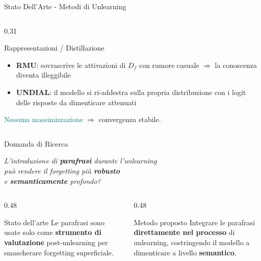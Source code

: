 \documentclass[aspectratio=169,11pt]{beamer}
\begin{document}
\begin{frame}{Stato Dell'Arte - Metodi di Unlearning}
\begin{columns}[T]
\begin{column}{0.31\textwidth}
\begin{block}{\small Rappresentazioni / Distillazione}
\begin{itemize}
          \item \textbf{RMU}: sovrascrive le attivazioni di $D_f$ con rumore casuale $\Rightarrow$ la conoscenza diventa illeggibile
          \item \textbf{UNDIAL}: il modello si ri-addestra sulla propria distribuzione con i logit delle risposte da dimenticare attenuati
        \end{itemize}
        \vspace{0.5em}
        {\tiny \textcolor{teal}{Nessuna massimizzazione} $\Rightarrow$ convergenza stabile.}
      \end{block}
    \end{column}
  \end{columns}
\end{frame}

\begin{frame}{Domanda di Ricerca}
  \begin{center}
    \Large
    \textit{L'introduzione di \textbf{parafrasi} durante l'unlearning\\[0.3em]
    può rendere il forgetting più \textbf{robusto}\\[0.3em]
    e \textbf{semanticamente} profondo?}
  \end{center}
  \vspace{1em}
  \begin{columns}[T]
    \begin{column}{0.48\textwidth}
      \begin{block}{Stato dell'arte}
        Le parafrasi sono usate solo come \textbf{strumento di valutazione} post-unlearning per smascherare forgetting superficiale.
      \end{block}
    \end{column}
    \begin{column}{0.48\textwidth}
      \begin{block}{Metodo proposto}
        Integrare le parafrasi \textbf{direttamente nel processo} di unlearning, costringendo il modello a dimenticare a livello \textbf{semantico}.
      \end{block}
    \end{column}
  \end{columns}
\end{frame}
\end{document}
